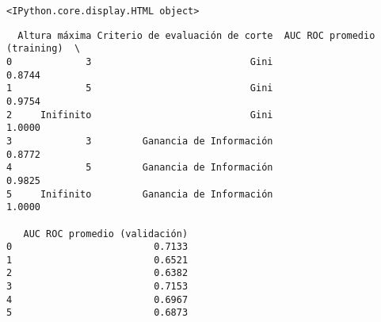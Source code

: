 \documentclass[11pt]{article}
\begin{document}
    
    \begin{verbatim}
<IPython.core.display.HTML object>
    \end{verbatim}

    
    
    \begin{verbatim}
  Altura máxima Criterio de evaluación de corte  AUC ROC promedio (training)  \
0             3                            Gini                       0.8744   
1             5                            Gini                       0.9754   
2     Inifinito                            Gini                       1.0000   
3             3         Ganancia de Información                       0.8772   
4             5         Ganancia de Información                       0.9825   
5     Inifinito         Ganancia de Información                       1.0000   

   AUC ROC promedio (validación)  
0                         0.7133  
1                         0.6521  
2                         0.6382  
3                         0.7153  
4                         0.6967  
5                         0.6873  
    \end{verbatim}
\end{document}
